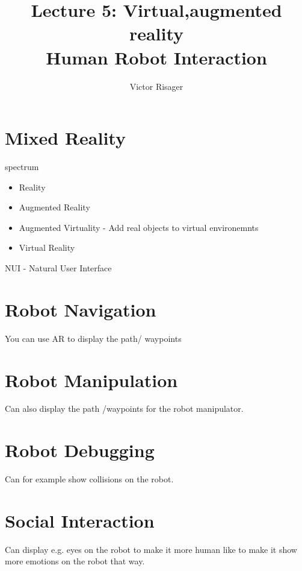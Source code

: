 \documentclass[a4paper]{article}
\title{Lecture 5: Virtual,augmented reality  \\
	\large Human Robot Interaction}
\author{Victor Risager}
\begin{document}
\maketitle

\section{Mixed Reality}
spectrum
\begin{itemize}
	\item Reality
	\item Augmented Reality
	\item Augmented Virtuality - Add real objects to virtual environemnts
	\item Virtual Reality
\end{itemize}

NUI - Natural User Interface

\section{Robot Navigation}
You can use AR to display the path/ waypoints

\section{Robot Manipulation}
Can also display the path /waypoints for the robot manipulator. 
\section{Robot Debugging}
Can for example show collisions on the robot. 
\section{Social Interaction}
Can display e.g. eyes on the robot to make it more human like to make it show more emotions on the robot that way. 
\end{document}
